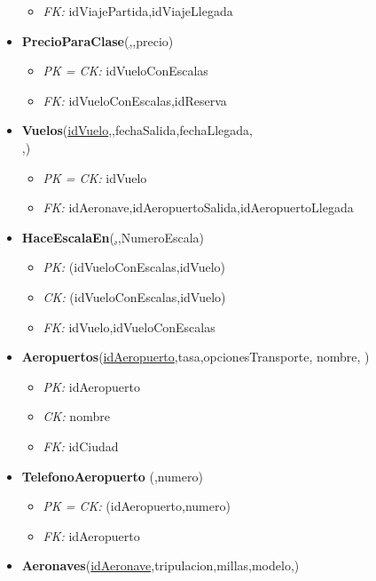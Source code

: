 \begin{itemize}
\begin{itemize}
			\item \textit{FK: } idViajePartida,idViajeLlegada
		\end{itemize}
	\item \textbf{PrecioParaClase}(\underline{,},precio)
		\begin{itemize}
			\item \textit{PK = CK: } idVueloConEscalas
			\item \textit{FK: } idVueloConEscalas,idReserva
		\end{itemize}
	\item \textbf{Vuelos}(\underline{idVuelo},,fechaSalida,fechaLlegada,\\ 
		,)
		\begin{itemize}
			\item \textit{PK = CK:} idVuelo
			\item \textit{FK: } idAeronave,idAeropuertoSalida,idAeropuertoLlegada
		\end{itemize}
	\item \textbf{HaceEscalaEn}(\underline{,},NumeroEscala)
		\begin{itemize}
			\item \textit{PK:} (idVueloConEscalas,idVuelo)
			\item \textit{CK:} (idVueloConEscalas,idVuelo)
			\item \textit{FK: } idVuelo,idVueloConEscalas
		\end{itemize}
	\item \textbf{Aeropuertos}(\underline{idAeropuerto},tasa,opcionesTransporte, nombre, )
		\begin{itemize}
			\item \textit{PK: } idAeropuerto
			\item \textit{CK: } nombre
			\item \textit{FK: } idCiudad
		\end{itemize}
	\item \textbf{TelefonoAeropuerto}	(,numero)
		\begin{itemize}
			\item \textit{PK = CK: } (idAeropuerto,numero)
			\item \textit{FK: } idAeropuerto
		\end{itemize}
	\item \textbf{Aeronaves}(\underline{idAeronave},tripulacion,millas,modelo,)

\end{itemize}
